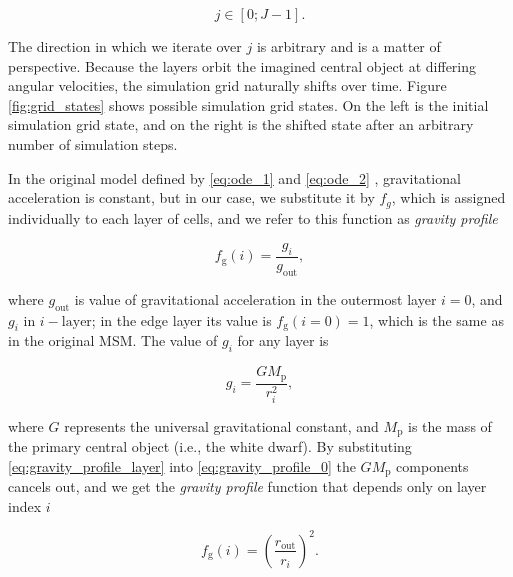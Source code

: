 \begin{equation}
j \in [0;J-1].
\end{equation}

The direction in which we iterate over $j$ is arbitrary and is a matter of perspective. Because the layers orbit the imagined central object at differing angular velocities, the simulation grid naturally shifts over time. Figure \ref{fig:grid_states} shows possible simulation grid states. On the left is the initial simulation grid state, and on the right is the shifted state after an arbitrary number of simulation steps.


In the original model defined by \ref{eq:ode_1} and \ref{eq:ode_2} \cite{msmm1999}, gravitational acceleration is constant, but in our case, we substitute it by $f_g$, which is assigned individually to each layer of cells, and we refer to this function as \emph{gravity profile}

\begin{equation}
    f_{\text{g}}(i) = \frac{g_i}{g_{\text{out}}},
    \label{eq:gravity_profile_0}
\end{equation}

where $g_{\text{out}}$ is value of gravitational acceleration in the outermost layer $i=0$, and $g_i$ in ${i-\mathrm{layer}}$; in the edge layer its value is ${f_{\text{g}}(i=0) = 1}$, which is the same as in the original MSM. The value of $g_i$ for any layer is 

\begin{equation}
    g_i = \frac{GM_{\text{p}}}{r_i^2},
    \label{eq:gravity_profile_layer}
\end{equation}

where $G$ represents the universal gravitational constant, and $M_{\mathrm{p}}$ is the mass of the primary central object (i.e., the white dwarf). By substituting \eqref{eq:gravity_profile_layer} into \eqref{eq:gravity_profile_0} the $GM_{\text{p}}$ components cancels out, and we get the \emph{gravity profile} function that depends only on layer index $i$

\begin{equation}
	f_{\text{g}}(i) = \left( \frac{r_{\text{out}}}{r_i} \right)^2.
	\label{eq:gravity_profile_final}
\end{equation}

